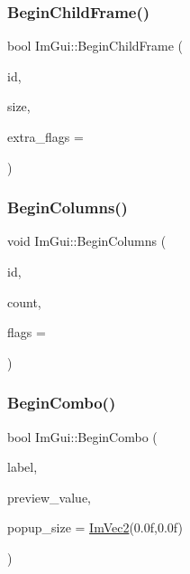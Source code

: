 \subsubsection{\texorpdfstring{Begin\+Child\+Frame()}{BeginChildFrame()}}
{\footnotesize\ttfamily bool Im\+Gui\+::\+Begin\+Child\+Frame (\begin{DoxyParamCaption}\item[{\mbox{\hyperlink{imgui_8h_a1785c9b6f4e16406764a85f32582236f}{Im\+Gui\+ID}}}]{id,  }\item[{const \mbox{\hyperlink{struct_im_vec2}{Im\+Vec2}} \&}]{size,  }\item[{\mbox{\hyperlink{imgui_8h_a0b8e067ab4f7a818828c8d89e531addc}{Im\+Gui\+Window\+Flags}}}]{extra\+\_\+flags = {} }\end{DoxyParamCaption})}

\mbox{\label{namespace_im_gui_a4b0c247a5d091c5921c58de6bc8215aa}} 
\subsubsection{\texorpdfstring{Begin\+Columns()}{BeginColumns()}}
{\footnotesize\ttfamily void Im\+Gui\+::\+Begin\+Columns (\begin{DoxyParamCaption}\item[{const char $\ast$}]{id,  }\item[{int}]{count,  }\item[{\mbox{\hyperlink{imgui_8h_a0edb3053546fcf6c5f7dcb7531c3a17a}{Im\+Gui\+Columns\+Flags}}}]{flags = {} }\end{DoxyParamCaption})}

\mbox{\label{namespace_im_gui_a08acc516e0de3cbb99f00774778a440a}} 
\subsubsection{\texorpdfstring{Begin\+Combo()}{BeginCombo()}}
{\footnotesize\ttfamily bool Im\+Gui\+::\+Begin\+Combo (\begin{DoxyParamCaption}\item[{const char $\ast$}]{label,  }\item[{const char $\ast$}]{preview\+\_\+value,  }\item[{\mbox{\hyperlink{struct_im_vec2}{Im\+Vec2}}}]{popup\+\_\+size = {\ttfamily \mbox{\hyperlink{struct_im_vec2}{Im\+Vec2}}(0.0f,0.0f)} }\end{DoxyParamCaption})}

